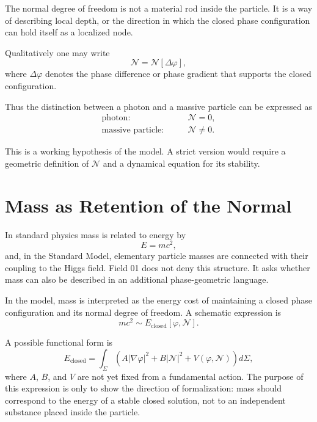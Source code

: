 \documentclass[11pt,a4paper]{article}
\newcommand{\phase}{\varphi}
\newcommand{\normal}{\mathcal{N}}
\begin{document}
The normal degree of freedom is not a material rod inside the particle. It is a way of describing local depth, or the direction in which the closed phase configuration can hold itself as a localized node.

Qualitatively one may write
\begin{equation}
\normal = \normal[\Delta\phase],
\end{equation}
where $\Delta\phase$ denotes the phase difference or phase gradient that supports the closed configuration.

Thus the distinction between a photon and a massive particle can be expressed as
\begin{equation}
\begin{aligned}
\text{photon}:& \qquad \normal = 0, \\
\text{massive particle}:& \qquad \normal \neq 0.
\end{aligned}
\end{equation}

This is a working hypothesis of the model. A strict version would require a geometric definition of $\normal$ and a dynamical equation for its stability.

\section{Mass as Retention of the Normal}

In standard physics mass is related to energy by
\begin{equation}
E = mc^2,
\end{equation}
and, in the Standard Model, elementary particle masses are connected with their coupling to the Higgs field. Field 01 does not deny this structure. It asks whether mass can also be described in an additional phase-geometric language.

In the model, mass is interpreted as the energy cost of maintaining a closed phase configuration and its normal degree of freedom. A schematic expression is
\begin{equation}
m c^2 \sim E_{\mathrm{closed}}[\phase,\normal].
\end{equation}

A possible functional form is
\begin{equation}
E_{\mathrm{closed}} = \int_{\Sigma} \left( A |\nabla \phase|^2 + B |\normal|^2 + V(\phase,\normal) \right) d\Sigma,
\end{equation}
where $A$, $B$, and $V$ are not yet fixed from a fundamental action. The purpose of this expression is only to show the direction of formalization: mass should correspond to the energy of a stable closed solution, not to an independent substance placed inside the particle.
\end{document}
